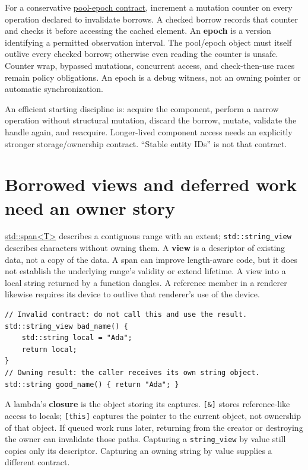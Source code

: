 For a conservative \hyperref[appendix-aa405b7c3903]{pool-epoch contract}, increment a mutation counter on every operation declared to invalidate borrows. A checked borrow records that counter and checks it before accessing the cached element. An \textbf{epoch} is a version identifying a permitted observation interval. The pool/epoch object must itself outlive every checked borrow; otherwise even reading the counter is unsafe. Counter wrap, bypassed mutations, concurrent access, and check-then-use races remain policy obligations. An epoch is a debug witness, not an owning pointer or automatic synchronization.

An efficient starting discipline is: acquire the component, perform a narrow operation without structural mutation, discard the borrow, mutate, validate the handle again, and reacquire. Longer-lived component access needs an explicitly stronger storage/ownership contract. ``Stable entity IDs'' is not that contract.

\section{Borrowed views and deferred work need an owner story}\label{05-engine-i-ch003-borrowed-views-and-deferred-work-need-an-owner-story}

\hyperref[appendix-aea529eb5175]{std::span\textless T\textgreater{}} describes a contiguous range with an extent; \texttt{std::string\_view} describes characters without owning them. A \textbf{view} is a descriptor of existing data, not a copy of the data. A span can improve length-aware code, but it does not establish the underlying range's validity or extend lifetime. A view into a local string returned by a function dangles. A reference member in a renderer likewise requires its device to outlive that renderer's use of the device.

\begin{verbatim}
// Invalid contract: do not call this and use the result.
std::string_view bad_name() {
    std::string local = "Ada";
    return local;
}
// Owning result: the caller receives its own string object.
std::string good_name() { return "Ada"; }
\end{verbatim}

A lambda's \textbf{closure} is the object storing its captures. \texttt{{[}\&{]}} stores reference-like access to locals; \texttt{{[}this{]}} captures the pointer to the current object, not ownership of that object. If queued work runs later, returning from the creator or destroying the owner can invalidate those paths. Capturing a \texttt{string\_view} by value still copies only its descriptor. Capturing an owning string by value supplies a different contract.

